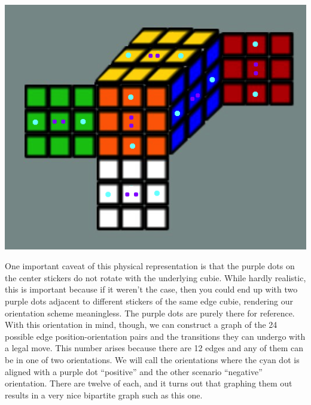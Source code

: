 \documentclass[10pt,letterpaper]{report}
\begin{document}
\begin{center}
\includegraphics[scale=.65]{images/edgeOrientation.png} 
\end{center}

One important caveat of this physical representation is that the purple dots on the center stickers do not rotate with the underlying cubie.  While hardly realistic, this is important because if it weren't the case, then you could end up with two purple dots adjacent to different stickers of the same edge cubie, rendering our orientation scheme meaningless.  The purple dots are purely there for reference.  With this orientation in mind, though, we can construct a graph of the 24 possible edge position-orientation pairs and the transitions they can undergo with a legal move.  This number arises because there are 12 edges and any of them can be in one of two orientations.  We will call the orientations where the cyan dot is aligned with a purple dot ``positive'' and the other scenario ``negative'' orientation.  There are twelve of each, and it turns out that graphing them out results in a very nice bipartite graph such as this one.
\end{document}
